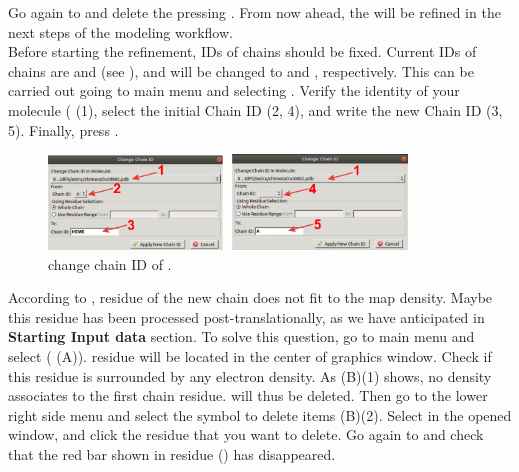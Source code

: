   Go again to  and delete the   pressing . From now ahead, the   will be refined in the next steps of the modeling workflow.\\
  
  Before starting the refinement, IDs of chains should be fixed. Current IDs of chains are  and  (see ), and will be changed to  and , respectively. This can be carried out going to main \coot menu and selecting . Verify the identity of your  molecule ( (1), select the initial Chain ID (2, 4), and write the new Chain ID (3, 5). Finally, press .
 
 \begin{figure}[H]
  \centering 
  \captionsetup{width=.7\linewidth} 
  \includegraphics[width=0.85\textwidth]{Images/Fig26}
  \caption{\coot change chain ID of  .}
  \label{fig:coot_change_name_ID}
  \end{figure}
  
  According to ,  residue of the new chain  does not fit to the map density. Maybe this residue has been processed post-translationally, as we have anticipated in \textbf{Starting Input data} section. To solve this question, go to \coot main menu and select  ( (A)).  residue will be located in the center of \coot graphics window. Check if this residue is surrounded by any electron density. As  (B)(1) shows, no density associates to the first chain residue.  will thus be deleted. Then go to the lower right side menu and select the symbol to delete items (B)(2). Select  in the opened  window, and click the  residue that you want to delete. Go again to  and check that the red bar shown in  residue () has disappeared.
  
